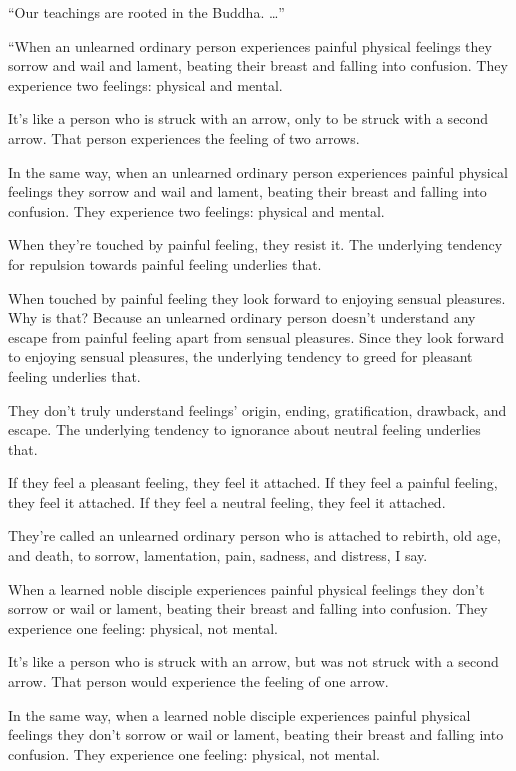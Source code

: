 \documentclass[12pt,openany]{book}%
\begin{document}
“Our teachings are rooted in the Buddha. …” 

“When an unlearned ordinary person experiences painful physical feelings they sorrow and wail and lament, beating their breast and falling into confusion. They experience two feelings: physical and mental. 

It’s like a person who is struck with an arrow, only to be struck with a second arrow. That person experiences the feeling of two arrows. 

In the same way, when an unlearned ordinary person experiences painful physical feelings they sorrow and wail and lament, beating their breast and falling into confusion. They experience two feelings: physical and mental. 

When they’re touched by painful feeling, they resist it. The underlying tendency for repulsion towards painful feeling underlies that. 

When touched by painful feeling they look forward to enjoying sensual pleasures. Why is that? Because an unlearned ordinary person doesn’t understand any escape from painful feeling apart from sensual pleasures. Since they look forward to enjoying sensual pleasures, the underlying tendency to greed for pleasant feeling underlies that. 

They don’t truly understand feelings’ origin, ending, gratification, drawback, and escape. The underlying tendency to ignorance about neutral feeling underlies that. 

If they feel a pleasant feeling, they feel it attached. If they feel a painful feeling, they feel it attached. If they feel a neutral feeling, they feel it attached. 

They’re called an unlearned ordinary person who is attached to rebirth, old age, and death, to sorrow, lamentation, pain, sadness, and distress, I say. 

When a learned noble disciple experiences painful physical feelings they don’t sorrow or wail or lament, beating their breast and falling into confusion. They experience one feeling: physical, not mental. 

It’s like a person who is struck with an arrow, but was not struck with a second arrow. That person would experience the feeling of one arrow. 

In the same way, when a learned noble disciple experiences painful physical feelings they don’t sorrow or wail or lament, beating their breast and falling into confusion. They experience one feeling: physical, not mental. 
\end{document}
